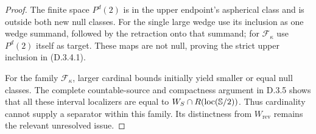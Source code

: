 \begin{proof}
The finite space $P^d(2)$ is in the upper endpoint's aspherical
class and is outside both new null classes. For the single
large wedge use its inclusion as one wedge summand, followed
by the retraction onto that summand; for
$\mathcal F_\kappa$ use $P^d(2)$ itself as target. These maps
are not null, proving the strict upper inclusion in (D.3.4.1).

For the family $\mathcal F_\kappa$, larger cardinal bounds
initially yield smaller or equal null classes. The complete
countable-source and compactness argument in D.3.5 shows that
all these interval localizers are equal to
$W_S\cap R(\operatorname{loc}(\mathbb S/2))$. Thus cardinality cannot
supply a separator within this family. Its distinctness
from $W_{\mathrm{rev}}$ remains the relevant unresolved issue.
\end{proof}
